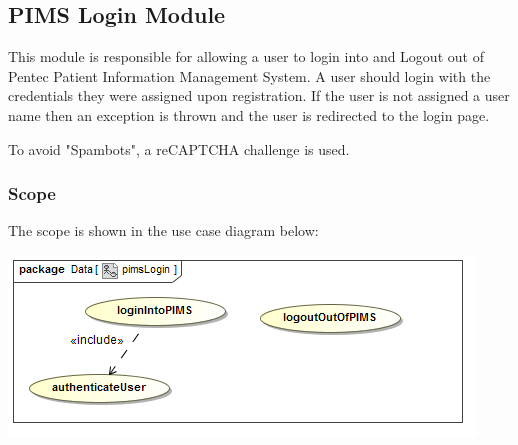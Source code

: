 \subsection{PIMS Login Module}
This module is responsible for allowing a user to login into and Logout out of Pentec Patient Information Management System. A user should login with the credentials they were assigned upon registration. If the user is not assigned a user name then an exception is thrown and the user is redirected to the login page. \par 

To avoid "Spambots", a reCAPTCHA challenge is used. 

\subsubsection{Scope}
The scope is shown in the use case diagram below: \par
\includegraphics[width=0.75\linewidth]{./Graphics/pimsLogin/pimsLogin}

